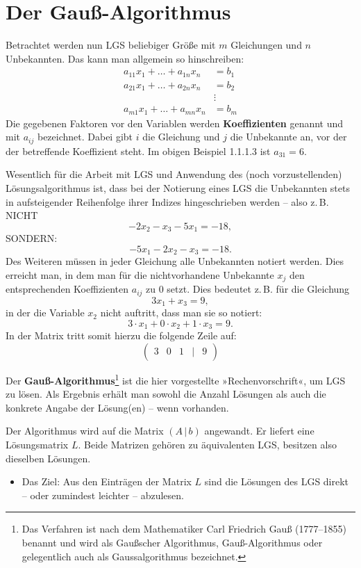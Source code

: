 \section{Der Gauß-Algorithmus}


Betrachtet werden nun LGS beliebiger Größe mit $m$ Gleichungen und $n$ Unbekannten. Das kann man allgemein so hinschreiben:
\begin{align*}
  a_{11} x_1 + \ldots + a_{1n} x_n &= b_1\\
  a_{21} x_1 + \ldots + a_{2n} x_n &= b_2\\
  &\vdots\\
  a_{m1} x_1 + \ldots + a_{mn} x_n &= b_m
\end{align*}
Die gegebenen Faktoren vor den Variablen werden \textbf{Koeffizienten} genannt und mit $a_{ij}$ bezeichnet. Dabei gibt $i$ die Gleichung und $j$ die Unbekannte an, vor der der betreffende Koeffizient steht. Im obigen Beispiel 1.1.1.3 ist $a_{31} = 6$.

Wesentlich für die Arbeit mit LGS und Anwendung des (noch vorzustellenden) Lösungsalgorithmus ist, dass bei der Notierung eines LGS die Unbekannten stets in aufsteigender Reihenfolge ihrer Indizes hingeschrieben werden -- also z.\,B. NICHT
\[ -2x_2 - x_3 - 5x_1 = -18 , \]
SONDERN:
\[ -5x_1 - 2x_2 - x_3 = -18 . \]
Des Weiteren müssen in jeder Gleichung alle Unbekannten notiert werden. Dies erreicht man, in dem man für die nichtvorhandene Unbekannte $x_j$ den entsprechenden Koeffizienten $a_{ij}$ zu 0 setzt. Dies bedeutet z.\,B. für die Gleichung
\[ 3x_1 + x_3 = 9 , \]
in der die Variable $x_2$ nicht auftritt, dass man sie so notiert:
\[ 3 \cdot x_1 + 0 \cdot x_2 + 1 \cdot x_3 = 9 . \]
In der Matrix tritt somit hierzu die folgende Zeile auf:
\[ \begin{pmatrix} 3 & 0 & 1 & | & 9 \end{pmatrix} \]

Der \textbf{Gauß-Algorithmus}\footnote{Das Verfahren ist nach dem Mathematiker Carl Friedrich Gauß (1777--1855) benannt und wird als Gaußscher Algorithmus, Gauß-Algorithmus oder gelegentlich auch als Gaussalgorithmus bezeichnet.} ist die hier vorgestellte »Rechenvorschrift«, um LGS zu lösen. Als Ergebnis erhält man sowohl die Anzahl Lösungen als auch die konkrete Angabe der Lösung(en) -- wenn vorhanden.

Der Algorithmus wird auf die Matrix $(A\,|\,b)$ angewandt. Er liefert eine Lösungsmatrix $L$. Beide Matrizen gehören zu äquivalenten LGS, besitzen also dieselben Lösungen.
\begin{itemize}
  \item Das Ziel: Aus den Einträgen der Matrix $L$ sind die Lösungen des LGS direkt -- oder zumindest leichter -- abzulesen.
\end{itemize}


